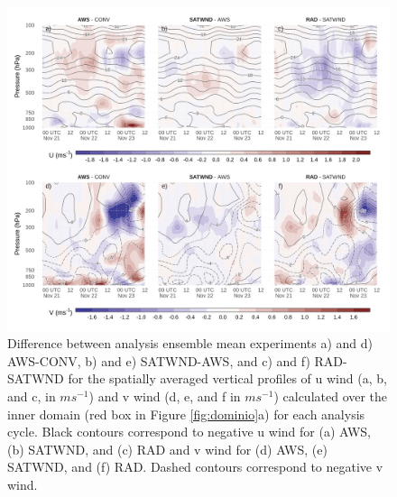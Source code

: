 \documentclass[authoryear,preprint,review,12pt]{elsarticle} %
\begin{document}
\begin{figure}[ht]

{\centering \includegraphics{../figures/UV-diff-1} 

}

\caption{Difference between analysis ensemble mean experiments a) and d) AWS-CONV, b) and e) SATWND-AWS, and c) and f) RAD-SATWND for the spatially averaged vertical profiles of u wind (a, b, and c, in \(ms^{-1}\)) and v wind (d, e, and f in \(ms^{-1}\)) calculated over the inner domain (red box in Figure \ref{fig:dominio}a) for each analysis cycle. Black contours correspond to negative u wind for (a) AWS, (b) SATWND, and (c) RAD and v wind for (d) AWS, (e) SATWND, and (f) RAD. Dashed contours correspond to negative v wind.}\label{fig:UV-diff}
\end{figure}
\end{document}
